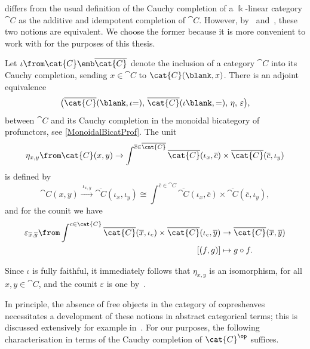 \begin{remark}
   differs from the usual definition of the Cauchy completion of a \(\Bbbk\)\hyp{}linear category \(\cat{C}\)
  as the additive and idempotent completion of \(\cat{C}\).
  However, by~\cite[Proposition~2]{borceux-dejean1986:CauchyCompletionCategoryTheory}
  and~\cite[Corollary~4.22]{lack-tendas2022:FlatFilteredColimts},
  these two notions are equivalent.
  We choose the former because it is more convenient to work with for the purposes of this thesis.
\end{remark}

\begin{example}\label{ex:cauchy-tensor-prod-in-prof-fin}
  Let \(\iota\from \cat{C} \emb \overline{\cat{C}}\)
  denote the inclusion of a category \(\cat{C}\) into its Cauchy completion,
  sending \(x \in \cat{C}\) to \(\cat{C}(\blank, x)\).
  There is an adjoint equivalence
  \[
    \big(\overline{\cat{C} }(\blank, \iota {   =}),\, \overline{\cat{C} }(\iota \blank, { = }),\, \eta,\, \varepsilon\big),
  \]
  between \(\cat{C}\) and its Cauchy completion in the monoidal bicategory of profunctors,
  see \cref{MonoidalBicatProf}.
  The unit
  \[
    \eta_{x, y} \from \cat{C}(x, y) \to \int^{\overline{c} \in \overline{\cat{C}}} \overline{\cat{C}}(\iota_x, \overline{c}) \times \overline{\cat{C} }(\overline{c}, \iota_y)
  \]
  is defined by
  \[
    \cat{C}(x, y)
    \xrightarrow{\;\iota_{x, y}\;} \overline{\cat{C} }(\iota_{x}, \iota _{y})
    \cong \int^{\overline{c} \in \cat{C} } \overline{\cat{C} }(\iota_x, \overline{c}) \times \overline{\cat{C} }(\overline{c}, \iota_y),
  \]
  and for the counit we have
  \begin{align*}
    \varepsilon_{\overline{x}, \overline{y}}
    \from \int^{c \in \cat{C} } \overline{\cat{C}}(\overline{x}, \iota_c) \times \overline{\cat{C} }(\iota_c, \overline{y})
    &\to \overline{\cat{C} }(\overline{x}, \overline{y}) \\
    [(f, g)] &\mapsto g \circ f.
  \end{align*}

  Since \(\iota\) is fully faithful,
  it immediately follows that \(\eta_{x,y}\) is an isomorphism, for all \(x, y \in \cat{C}\),
  and the counit \(\varepsilon\) is one by~\cite[Theorem~1.1]{adamek01}.
\end{example}

In principle, the absence of free objects in the category of copresheaves necessitates a development of these notions in abstract categorical terms;
this is discussed extensively for example in~\cite{prest09:purit}.
For our purposes, the following characterisation in terms of the Cauchy completion of \(\cat{C}^{\op}\) suffices.


